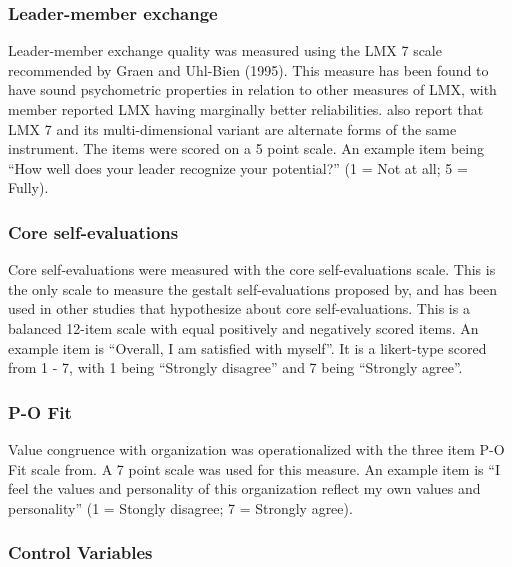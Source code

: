 \documentclass[12pt,a4paper,]{article}
\begin{document}
\subsubsection{Leader-member exchange}\label{leader-member-exchange-1}

Leader-member exchange quality was measured using the LMX 7 scale
recommended by Graen and Uhl-Bien (1995). This measure has been found to
have sound psychometric properties in relation to other measures of LMX,
with member reported LMX having marginally better reliabilities. also
report that LMX 7 and its multi-dimensional variant are alternate forms
of the same instrument. The items were scored on a 5 point scale. An
example item being ``How well does your leader recognize your
potential?'' (1 = Not at all; 5 = Fully).

\subsubsection{Core self-evaluations}\label{core-self-evaluations-1}

Core self-evaluations were measured with the core self-evaluations
scale. This is the only scale to measure the gestalt self-evaluations
proposed by, and has been used in other studies that hypothesize about
core self-evaluations. This is a balanced 12-item scale with equal
positively and negatively scored items. An example item is ``Overall, I
am satisfied with myself''. It is a likert-type scored from 1 - 7, with
1 being ``Strongly disagree'' and 7 being ``Strongly agree''.

\subsubsection{P-O Fit}\label{p-o-fit-1}

Value congruence with organization was operationalized with the three
item P-O Fit scale from. A 7 point scale was used for this measure. An
example item is ``I feel the values and personality of this organization
reflect my own values and personality'' (1 = Stongly disagree; 7 =
Strongly agree).

\subsubsection{Control Variables}\label{control-variables}
\end{document}
